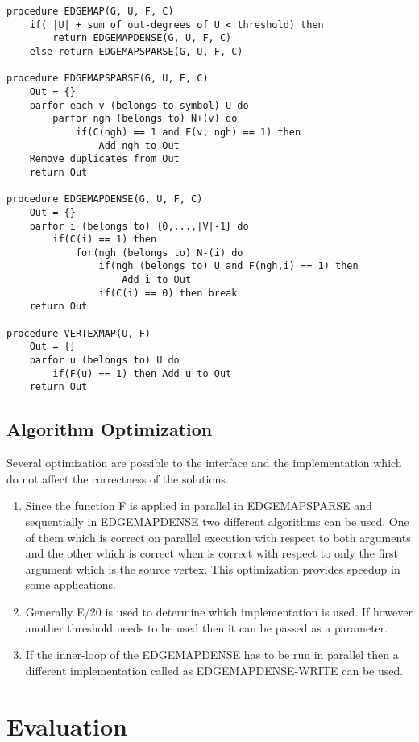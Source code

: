 \documentclass[a4paper,10pt,twoside]{article}
\begin{document}
\begin{lstlisting}
procedure EDGEMAP(G, U, F, C)
	if( |U| + sum of out-degrees of U < threshold) then
		return EDGEMAPDENSE(G, U, F, C)
	else return EDGEMAPSPARSE(G, U, F, C)

procedure EDGEMAPSPARSE(G, U, F, C)
	Out = {}
	parfor each v (belongs to symbol) U do
		parfor ngh (belongs to) N+(v) do
			if(C(ngh) == 1 and F(v, ngh) == 1) then
				Add ngh to Out
	Remove duplicates from Out
	return Out

procedure EDGEMAPDENSE(G, U, F, C)
	Out = {}
	parfor i (belongs to) {0,...,|V|-1} do
		if(C(i) == 1) then
			for(ngh (belongs to) N-(i) do
				if(ngh (belongs to) U and F(ngh,i) == 1) then
					Add i to Out
				if(C(i) == 0) then break
	return Out

procedure VERTEXMAP(U, F)
	Out = {}
	parfor u (belongs to) U do
		if(F(u) == 1) then Add u to Out
	return Out

\end{lstlisting}

\subsection{Algorithm Optimization}

Several optimization are possible to the interface and the implementation which do not affect the correctness of the solutions.
\begin{enumerate}
\item Since the function F is applied in parallel in EDGEMAPSPARSE and sequentially in EDGEMAPDENSE two different algorithms can be used. One of them which is correct on parallel execution with respect to both arguments and the other which is correct when is correct with respect to only the first argument which is the source vertex. This optimization provides speedup in some applications.
\item Generally \textbar E\textbar/20  is used to determine which implementation is used. If however another threshold needs to be used then it can be passed as a parameter.
\item If the inner-loop of the EDGEMAPDENSE has to be run in parallel then a different implementation called as EDGEMAPDENSE-WRITE can be used.
\end{enumerate}

\section{Evaluation}
\end{document}
